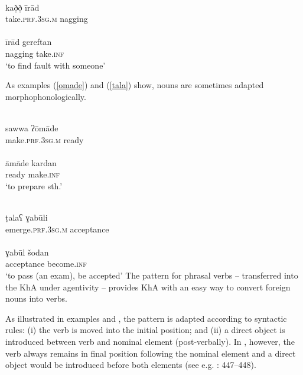 \documentclass[output=paper,nonflat]{langsci/langscibook}
\begin{document}
\ea \label{irad}
\\
\gll kað̣ð̣ īrād\\
     take.\textsc{prf}.3\textsc{sg}.\textsc{m} nagging\\ 
\\
\gll īrād gereftan\\
     nagging take.\textsc{inf}\\
\glt ‘to find fault with someone’ 
\z\z

 As examples (\ref{omade}) and (\ref{tala}) show,  nouns are sometimes adapted morphophonologically.

\ea \label{omade}
\\
\gll sawwa ʔōmāde\\
     make.\textsc{prf}.3\textsc{sg}.\textsc{m} ready\\ 
\\
\gll āmāde kardan \\
     ready make.\textsc{inf}\\
\glt ‘to prepare sth.’
\z\z

\ea \label{tala}
\\
\gll ṭalaʕ ɣabūli\footnotemark \\
     emerge.\textsc{prf}.3\textsc{sg}.\textsc{m} acceptance\\
\\
\gll ɣabūl šodan\\
     acceptance become.\textsc{inf} \\
\glt ‘to pass (an exam), be accepted’
\z\z
{}
The pattern for phrasal verbs – transferred into the  KhA under  agentivity – provides KhA with an easy way to convert foreign nouns into verbs.

As illustrated in examples  and , the pattern is adapted according to  syntactic rules: (i) the verb is moved into the initial position; and (ii) a direct object is introduced between verb and nominal element (post-verbally). In , however, the verb always remains in final position following the nominal element and a direct object would be introduced before both elements (see e.g. \citealt{Majidi1990}: 447–448).
\end{document}
